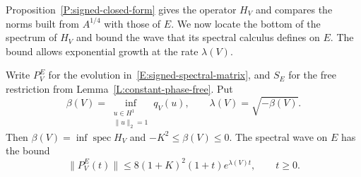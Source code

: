 Proposition~\ref{P:signed-closed-form} gives the operator $H_V$ and compares
the norms built from $A^{1/4}$ with those of $E$. We now locate the bottom of
the spectrum of $H_V$ and bound the wave that its spectral calculus defines on
$E$. The bound allows exponential growth at the rate $\lambda(V)$.

\begin{lemma}\label{L:signed-spectral-wave}
  Write $P_V^E$ for the evolution in~\eqref{E:signed-spectral-matrix}, and $S_E$
  for the free restriction from Lemma~\ref{L:constant-phase-free}. Put
  \[
    \beta(V)=\inf_{\substack{u\in H^1\\\|u\|_2=1}}q_V(u),
    \qquad \lambda(V)=\sqrt{-\beta(V)} .
  \]
  Then $\beta(V) = \inf\operatorname{spec}H_V$ and $-K^2 \le \beta(V) \le 0$.
  The spectral wave on $E$ has the bound
  \begin{equation}\label{E:signed-E-wave}
    \|P_V^E(t)\|\le8(1+K)^2(1+t)e^{\lambda(V)t},\qquad t\ge0.
  \end{equation}
\end{lemma}

